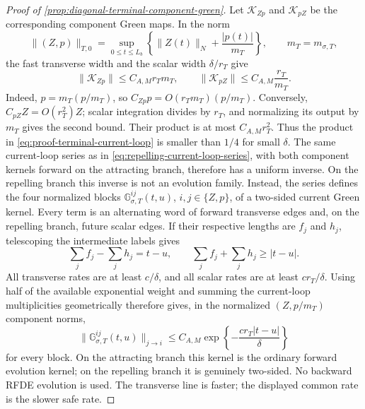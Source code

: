 \begin{proof}[Proof of
\cref{prop:diagonal-terminal-component-green}]
Let \(\mathcal K_{Zp}\) and \(\mathcal K_{pZ}\) be the corresponding
component Green maps.  In the norm
\[
 \|(Z,p)\|_{T,0}
 =\sup_{0\le t\le L_b}
       \left\{\|Z(t)\|_N+\frac{|p(t)|}{m_T}\right\},
 \qquad m_T=m_{\sigma,T},
\]
the fast transverse width and the scalar width \(\delta/r_T\) give
\begin{equation}
 \|\mathcal K_{Zp}\|\le C_{A,M}r_Tm_T,\qquad
 \|\mathcal K_{pZ}\|\le C_{A,M}\frac{r_T}{m_T}.
                                                        \label{eq:proof-terminal-current-loop}
\end{equation}
Indeed, \(p=m_T(p/m_T)\), so
\(C_{Zp}p=O(r_Tm_T)(p/m_T)\).  Conversely,
\(C_{pZ}Z=O(r_T^2)Z\); scalar integration divides by \(r_T\), and
normalizing its output by \(m_T\) gives the second bound.  Their product
is at most \(C_{A,M}r_T^2\).  Thus the product in
\cref{eq:proof-terminal-current-loop} is smaller than \(1/4\) for small
\(\delta\).  The same current-loop series as in
\cref{eq:repelling-current-loop-series}, with both component kernels
forward on the attracting branch, therefore has a uniform inverse.
On the repelling branch this inverse is not an evolution family.  Instead,
the series defines the four normalized blocks
\(\mathbb G_{\sigma,T}^{ij}(t,u)\),
\(i,j\in\{Z,p\}\), of a two-sided current Green kernel.  Every term is an
alternating word of forward transverse edges and, on the repelling branch,
future scalar edges.  If their respective lengths are \(f_j\) and \(h_j\),
telescoping the intermediate labels gives
\[
 \sum_j f_j-\sum_j h_j=t-u,
 \qquad
 \sum_j f_j+\sum_j h_j\ge |t-u|.
\]
All transverse rates are at least \(c/\delta\), and all scalar rates are at
least \(cr_T/\delta\).  Using half of the available exponential weight and
summing the current-loop multiplicities geometrically therefore gives, in
the normalized \((Z,p/m_T)\) component norms,
\begin{equation}
 \|\mathbb G_{\sigma,T}^{ij}(t,u)\|_{j\to i}
 \le C_{A,M}
   \exp\left\{-\frac{cr_T|t-u|}{\delta}\right\}   \label{eq:proof-terminal-full-current-kernel}
\end{equation}
for every block.  On the attracting branch this kernel is the ordinary
forward evolution kernel; on the repelling branch it is genuinely
two-sided.  No backward RFDE evolution is used.  The transverse line is
faster; the displayed common rate is the slower safe rate.


\end{proof}
